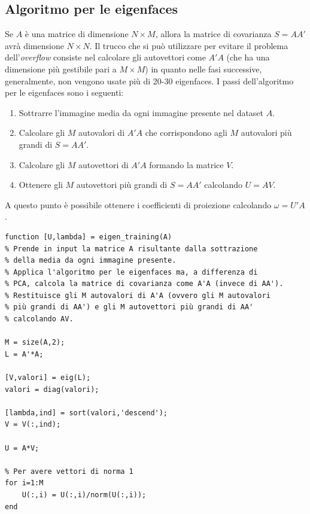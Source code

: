 \documentclass[12pt]{article}
\begin{document}
\subsection{Algoritmo per le eigenfaces}
Se $A$ è una matrice di dimensione $N \times M$, allora la matrice di covarianza $S = A A'$ avrà dimensione $N \times N$. Il trucco che si può utilizzare per evitare il problema dell'\textit{overflow} consiste nel calcolare gli autovettori come $A' A$ (che ha una dimensione più gestibile pari a $M \times M$) in quanto nelle fasi successive, generalmente, non vengono usate più di 20-30 eigenfaces. I passi dell'algoritmo per le eigenfaces sono i seguenti:
\begin{enumerate}
    \item Sottrarre l'immagine media da ogni immagine presente nel dataset $A$.
    \item Calcolare gli $M$ autovalori di $A' A$ che corrispondono agli $M$ autovalori più grandi di $S = A A'$.
    \item Calcolare gli $M$ autovettori di $A' A$ formando la matrice $V$.
    \item Ottenere gli $M$ autovettori più grandi di $S = A A'$ calcolando $U = A V$.
\end{enumerate}
A questo punto è possibile ottenere i coefficienti di proiezione calcolando $\omega = U' A$.
\begin{verbatim}
function [U,lambda] = eigen_training(A)
% Prende in input la matrice A risultante dalla sottrazione
% della media da ogni immagine presente.
% Applica l'algoritmo per le eigenfaces ma, a differenza di
% PCA, calcola la matrice di covarianza come A'A (invece di AA').
% Restituisce gli M autovalori di A'A (ovvero gli M autovalori
% più grandi di AA') e gli M autovettori più grandi di AA'
% calcolando AV.

M = size(A,2);
L = A'*A;

[V,valori] = eig(L);
valori = diag(valori);

[lambda,ind] = sort(valori,'descend');
V = V(:,ind);

U = A*V;

% Per avere vettori di norma 1 
for i=1:M
    U(:,i) = U(:,i)/norm(U(:,i));
end
\end{verbatim}
\end{document}
